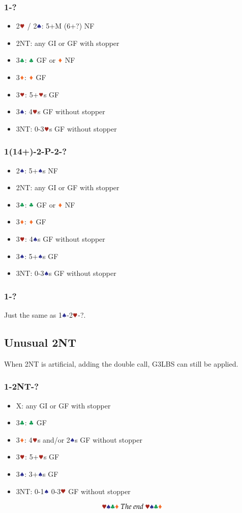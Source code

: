 \documentclass{article}
\begin{document}
\begin{multicols}{2}
\begin{CJK*}{UTF8}{gt}
\subsubsection{1\CCC-?}
\begin{itemize}
    \item 2$\hhh$ / 2$\sss$: 5+M (6+?) NF
    \item 2NT: any GI or GF with stopper
    \item 3$\ccc$: $\ccc$ GF or $\ddd$ NF
    \item 3$\ddd$: $\ddd$ GF
    \item 3$\hhh$: 5+$\hhh$s GF
    \item 3$\sss$: 4$\hhh$s GF without stopper
    \item 3NT: 0-3$\hhh$s GF without stopper
\end{itemize}

\subsubsection{1\CCC(14+)-2\CCC-P-2\HHH-?}
\begin{itemize}
    \item 2$\sss$: 5+$\sss$s NF
    \item 2NT: any GI or GF with stopper
    \item 3$\ccc$: $\ccc$ GF or $\ddd$ NF
    \item 3$\ddd$: $\ddd$ GF
    \item 3$\hhh$: 4$\sss$s GF without stopper
    \item 3$\sss$: 5+$\sss$s GF
    \item 3NT: 0-3$\sss$s GF without stopper
\end{itemize}

\subsubsection{1\SSS-?}
Just the same as 1$\sss$-2$\hhh$-?.

\subsection{Unusual 2NT}
When 2NT is artificial, adding the double call, G3LBS can still be applied.
\subsubsection{1\SSS-2NT-?}
\begin{itemize}
    \item X: any GI or GF with stopper
    \item 3$\ccc$: $\ccc$ GF
    \item 3$\ddd$: 4$\hhh$s and/or 2$\sss$s GF without stopper
    \item 3$\hhh$: 5+$\hhh$s GF
    \item 3$\sss$: 3+$\sss$s GF
    \item 3NT: 0-1$\sss$ 0-3$\hhh$ GF without stopper
\end{itemize}

$$\hhh\sss\ccc\ddd~The~end~\hhh\sss\ccc\ddd$$

\end{CJK*}
\end{multicols}
\end{document}
